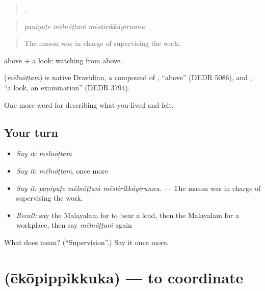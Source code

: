 \begin{quote}
  .
\end{quote}

\begin{quote}
\emph{paṇiyuṭe mēlnōṭṭaṁ mēstirikkāyirunnu.}
\end{quote}

\begin{quote}
The mason was in charge of supervising the work.
\end{quote}

 above +  a look: watching from above.

\begin{cousinweb}
\textbf{} (\emph{mēlnōṭṭaṁ}) is native Dravidian, a compound of , \textquotedblleft{}above\textquotedblright{} (DEDR 5086), and , \textquotedblleft{}a look, an examination\textquotedblright{} (DEDR 3794).
\end{cousinweb}

\begin{grammarlens}[title={What you've built}]
One more word for describing what you lived and felt.
\end{grammarlens}

\subsection*{Your turn}
\begin{itemize}
\raggedright
  \item \emph{Say it:} \emph{mēlnōṭṭaṁ}
  \item \emph{Say it:} \emph{mēlnōṭṭaṁ}, once more
  \item \emph{Say it:} \emph{paṇiyuṭe mēlnōṭṭaṁ mēstirikkāyirunnu.} — The mason was in charge of supervising the work.
  \item \emph{Recall:} say the Malayalam for to bear a load, then the Malayalam for a workplace, then say \emph{mēlnōṭṭaṁ} again
\end{itemize}

\begin{tcolorbox}[breakable,colback=teal!4,colframe=teal!35!black,title={Before you move on}]
What does  mean? (\textquotedblleft{}Supervision\textquotedblright{}.) Say it once more.
\end{tcolorbox}
\section[\texorpdfstring{\ml{ഏകോപിപ്പിക്കുക} (ēkōpippikkuka)}{ഏകോപിപ്പിക്കുക (ēkōpippikkuka)}]{ (ēkōpippikkuka) — to coordinate}

